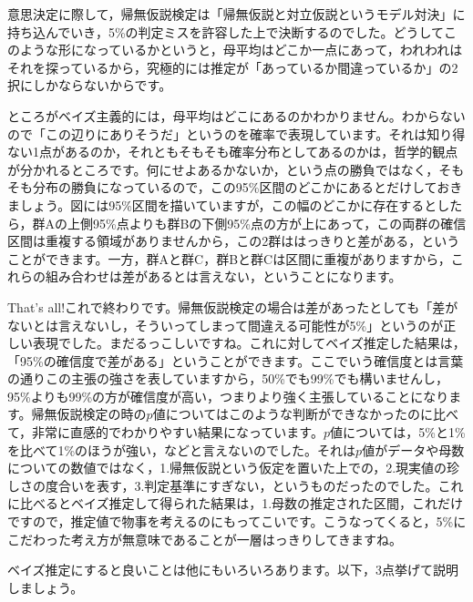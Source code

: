 \documentclass{ltjsarticle}
\begin{document}
意思決定に際して，帰無仮説検定は「帰無仮説と対立仮説というモデル対決」に持ち込んでいき，5\%の判定ミスを許容した上で決断するのでした。どうしてこのような形になっているかというと，母平均はどこか一点にあって，われわれはそれを探っているから，究極的には推定が「あっているか間違っているか」の2択にしかならないからです。

ところがベイズ主義的には，母平均はどこにあるのかわかりません。わからないので「この辺りにありそうだ」というのを確率で表現しています。それは知り得ない1点があるのか，それともそもそも確率分布としてあるのかは，哲学的観点が分かれるところです。何にせよあるかないか，という点の勝負ではなく，そもそも分布の勝負になっているので，この95\%区間のどこかにあるとだけしておきましょう。図には95\%区間を描いていますが，この幅のどこかに存在するとしたら，群Aの上側95\%点よりも群Bの下側95\%点の方が上にあって，この両群の確信区間は重複する領域がありませんから，この2群ははっきりと差がある，ということができます。一方，群Aと群C，群Bと群Cは区間に重複がありますから，これらの組み合わせは差があるとは言えない，ということになります。

That's all!これで終わりです。帰無仮説検定の場合は差があったとしても「差がないとは言えないし，そういってしまって間違える可能性が5\%」というのが正しい表現でした。まだるっこしいですね。これに対してベイズ推定した結果は，「95\%の確信度で差がある」ということができます。ここでいう確信度とは言葉の通りこの主張の強さを表していますから，50\%でも99\%でも構いませんし，95\%よりも99\%の方が確信度が高い，つまりより強く主張していることになります。帰無仮説検定の時の$p$値についてはこのような判断ができなかったのに比べて，非常に直感的でわかりやすい結果になっています。$p$値については，5\%と1\% を比べて1\%のほうが強い，などと言えないのでした。それは$p$値がデータや母数についての数値ではなく，1.帰無仮説という仮定を置いた上での，2.現実値の珍しさの度合いを表す，3.判定基準にすぎない，というものだったのでした。これに比べるとベイズ推定して得られた結果は，1.母数の推定された区間，これだけですので，推定値で物事を考えるのにもってこいです。こうなってくると，5\%にこだわった考え方が無意味であることが一層はっきりしてきますね。

ベイズ推定にすると良いことは他にもいろいろあります。以下，3点挙げて説明しましょう。
\end{document}

